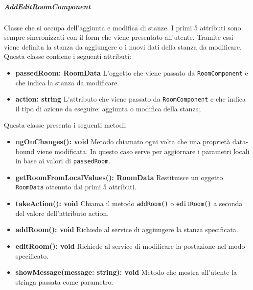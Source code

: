 \subparagraph{AddEditRoomComponent}
Classe che si occupa dell'aggiunta e modifica di stanze. I primi 5 attributi sono sempre sincronizzati con il form che viene presentato all'utente. Tramite essi viene definita la stanza da aggiungere o i nuovi dati della stanza da modificare.\newline
Questa classe contiene i seguenti attributi:
\begin{itemize}
	\item \textbf{passedRoom: RoomData 	} \newline
	L'oggetto che viene passato da \texttt{RoomComponent} e che indica la stanza da modificare.
	\item \textbf{action: string} \newline
	L'attributo che viene passato da \texttt{RoomComponent} e che indica il tipo di azione da eseguire: aggiunta o modifica della stanza;
\end{itemize}
Questa classe presenta i seguenti metodi:
\begin{itemize}
	\item \textbf{ngOnChanges(): void 	} \newline
	Metodo chiamato ogni volta che una proprietà data-bound viene modificata. In questo caso serve per aggiornare i parametri locali in base ai valori di \texttt{passedRoom}.
	\item \textbf{getRoomFromLocalValues(): RoomData 	} \newline
	Restituisce un oggetto \texttt{RoomData} ottenuto dai primi 5 attributi.
	\item \textbf{takeAction(): void 	} \newline
	Chiama il metodo \texttt{addRoom()} o \texttt{editRoom()} a seconda del valore dell'attributo action.
	\item \textbf{addRoom(): void 	} \newline
	Richiede al service di aggiungere la stanza specificata.
	\item \textbf{editRoom(): void} \newline
	Richiede al service di modificare la postazione nel modo specificato.
	\item \textbf{showMessage(message: string): void} \newline
	Metodo che mostra all'utente la stringa passata come parametro.
\end{itemize}

